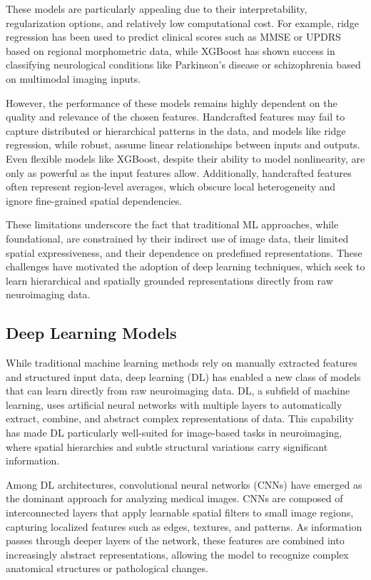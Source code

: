These models are particularly appealing due to their interpretability, regularization options, and relatively low computational cost. For example, ridge regression has been used to predict clinical scores such as MMSE or UPDRS based on regional morphometric data, while XGBoost has shown success in classifying neurological conditions like Parkinson’s disease or schizophrenia based on multimodal imaging inputs.

However, the performance of these models remains highly dependent on the quality and relevance of the chosen features. Handcrafted features may fail to capture distributed or hierarchical patterns in the data, and models like ridge regression, while robust, assume linear relationships between inputs and outputs. Even flexible models like XGBoost, despite their ability to model nonlinearity, are only as powerful as the input features allow. Additionally, handcrafted features often represent region-level averages, which obscure local heterogeneity and ignore fine-grained spatial dependencies.

These limitations underscore the fact that traditional ML approaches, while foundational, are constrained by their indirect use of image data, their limited spatial expressiveness, and their dependence on predefined representations. These challenges have motivated the adoption of deep learning techniques, which seek to learn hierarchical and spatially grounded representations directly from raw neuroimaging data.

\subsection{Deep Learning Models}
While traditional machine learning methods rely on manually extracted features and structured input data, deep learning (DL) has enabled a new class of models that can learn directly from raw neuroimaging data. DL, a subfield of machine learning, uses artificial neural networks with multiple layers to automatically extract, combine, and abstract complex representations of data. This capability has made DL particularly well-suited for image-based tasks in neuroimaging, where spatial hierarchies and subtle structural variations carry significant information.

Among DL architectures, convolutional neural networks (CNNs) have emerged as the dominant approach for analyzing medical images. CNNs are composed of interconnected layers that apply learnable spatial filters to small image regions, capturing localized features such as edges, textures, and patterns. As information passes through deeper layers of the network, these features are combined into increasingly abstract representations, allowing the model to recognize complex anatomical structures or pathological changes.

